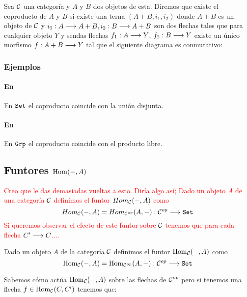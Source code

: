\begin{definition}
Sea $\mathcal{C}$ una categoría y $A$ y $B$ dos objetos de esta. Diremos que
existe el coproducto de $A$ y $B$
si existe una terna $(A+B, i_1, i_2)$
donde $A+B$ es un objeto de $\mathcal{C}$ y
$i_1 : A\longrightarrow A+B, i_2 : B\longrightarrow A+B$ son dos flechas tales
que para cualquier objeto $Y$ y sendas flechas $f_1 : A\longrightarrow Y$,
$f_2 : B\longrightarrow Y$ existe un único morfismo
$f : A+B\longrightarrow Y$ tal que el siguiente diagrama es conmutativo:
\begin{center}
\end{center}
\end{definition}

\subsubsection{Ejemplos}
\paragraph{En \Set}
En $\texttt{Set}$ el coproducto coincide con la unión disjunta.

\paragraph{En \Grp}
En $\texttt{Grp} $ el coproducto coincide con el producto libre.

\subsection{Funtores $\operatorname{Hom}(-, A)$}
\textcolor{red}{Creo que le das demasiadas vueltas a esto. Diría algo así; Dado un objeto $A$ de una categoría $\mathcal{C}$ definimos el funtor $Hom_{\mathcal{C}}(-,A)$ como $$Hom_{\mathcal{C}}(-,A)=Hom_{\mathcal{C}^{op}}(A,-):\mathcal{C}^{op}\longrightarrow \texttt{Set}$$ Si queremos observar el efecto de este funtor sobre $\mathcal{C}$ tenemos que para cada flecha $C'\longrightarrow C$....}

Dado un objeto $A$ de la categoría $\mathcal{C}$ definimos el funtor
$\operatorname{Hom}_{\mathcal{C}}(-, A)$ como
$$\operatorname{Hom}_{\mathcal{C}}(-, A) = \operatorname{Hom}_{\mathcal{C}^{op}}(A, -) : \mathcal{C}^{op}\longrightarrow \texttt{Set}$$

Sabemos cómo actúa $\operatorname{Hom}_{\mathcal{C}}(-, A)$ sobre las flechas de $\mathcal{C}^{op}$
pero si tenemos una flecha $f \in \operatorname{Hom}_{\mathcal{C}}(C, C')$ tenemos que:

